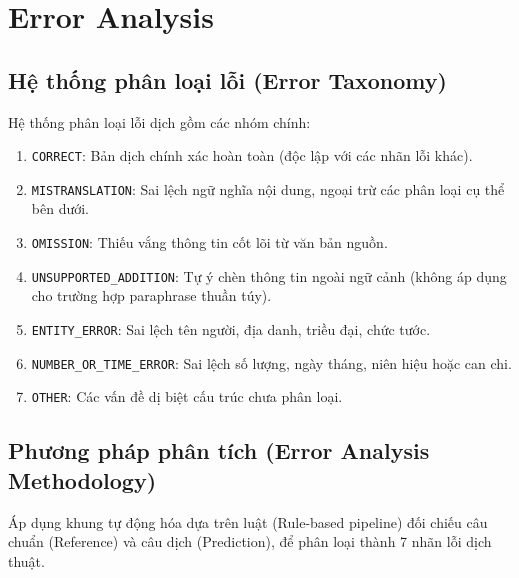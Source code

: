 \section{Error Analysis}
\subsection{Hệ thống phân loại lỗi (Error Taxonomy)}
Hệ thống phân loại lỗi dịch gồm các nhóm chính:
\begin{enumerate}
\item \texttt{CORRECT}: Bản dịch chính xác hoàn toàn (độc lập với các nhãn lỗi khác).
\item \texttt{MISTRANSLATION}: Sai lệch ngữ nghĩa nội dung, ngoại trừ các phân loại cụ thể bên dưới.
\item \texttt{OMISSION}: Thiếu vắng thông tin cốt lõi từ văn bản nguồn.
\item \texttt{UNSUPPORTED\_ADDITION}: Tự ý chèn thông tin ngoài ngữ cảnh (không áp dụng cho trường hợp paraphrase thuần túy).
\item \texttt{ENTITY\_ERROR}: Sai lệch tên người, địa danh, triều đại, chức tước.
\item \texttt{NUMBER\_OR\_TIME\_ERROR}: Sai lệch số lượng, ngày tháng, niên hiệu hoặc can chi.
\item \texttt{OTHER}: Các vấn đề dị biệt cấu trúc chưa phân loại.
\end{enumerate}  \subsection{Phương pháp phân tích (Error Analysis Methodology)}
Áp dụng khung tự động hóa dựa trên luật (Rule-based pipeline) đối chiếu câu chuẩn (Reference) và câu dịch (Prediction), để phân loại thành 7 nhãn lỗi dịch thuật.
